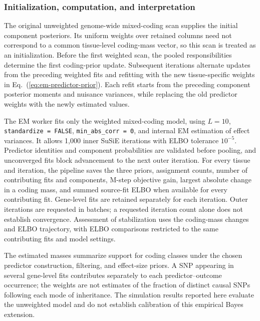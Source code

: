 \documentclass[12pt]{article}
\begin{document}
\subsubsection*{Initialization, computation, and interpretation}
The original unweighted genome-wide mixed-coding scan supplies the
initial component posteriors. Its uniform weights over retained columns
need not correspond to a common tissue-level coding-mass vector, so this
scan is treated as an initialization. Before the first weighted scan,
the pooled responsibilities determine the first coding-prior update.
Subsequent iterations alternate updates from the preceding weighted
fits and refitting with the new tissue-specific weights in
Eq.~(\ref{eq:em-predictor-prior}). Each refit starts from the preceding
component posterior moments and nuisance variances, while replacing the
old predictor weights with the newly estimated values.

The EM worker fits only the weighted mixed-coding model, using $L=10$,
\texttt{standardize = FALSE}, \texttt{min\_abs\_corr = 0}, and internal
EM estimation of effect variances. It allows 1,000 inner SuSiE iterations
with ELBO tolerance $10^{-5}$. Predictor identities and component
probabilities are validated before pooling, and unconverged fits block
advancement to the next outer iteration. For every tissue and iteration,
the pipeline saves the three priors, assignment counts, number of
contributing fits and components, M-step objective gain, largest absolute
change in a coding mass, and summed source-fit ELBO when available for
every contributing fit. Gene-level fits are retained separately for
each iteration. Outer iterations are requested in batches; a requested
iteration count alone does not establish convergence. Assessment of
stabilization uses the coding-mass changes and ELBO trajectory, with
ELBO comparisons restricted to the same contributing fits and model
settings.

The estimated masses summarize support for coding classes under the
chosen predictor construction, filtering, and effect-size priors. A SNP
appearing in several gene-level fits contributes separately to each
predictor--outcome occurrence; the weights are not estimates of the
fraction of distinct causal SNPs following each mode of inheritance.
The simulation results reported here evaluate the unweighted model and
do not establish calibration of this empirical Bayes extension.

\clearpage
\end{document}
